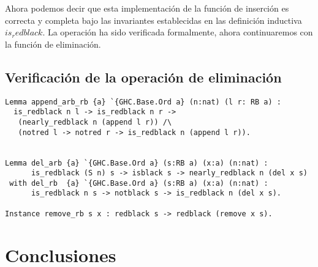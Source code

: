 \documentclass[letterpaper,12pt,oneside]{book}
\theoremstyle{plain}
\theoremstyle{definition}
\theoremstyle{remark}
\begin{document}
Ahora podemos decir que esta implementaci\'on de la funci\'on de inserci\'on es correcta y completa bajo las invariantes establecidas en las definici\'on inductiva $is_redblack$. La operaci\'on ha sido verificada formalmente, ahora continuaremos con la funci\'on de eliminaci\'on.  
\section{Verificación de la operación de eliminación}
\begin{verbatim}
Lemma append_arb_rb {a} `{GHC.Base.Ord a} (n:nat) (l r: RB a) : 
  is_redblack n l -> is_redblack n r ->
   (nearly_redblack n (append l r)) /\
   (notred l -> notred r -> is_redblack n (append l r)).


Lemma del_arb {a} `{GHC.Base.Ord a} (s:RB a) (x:a) (n:nat) :
      is_redblack (S n) s -> isblack s -> nearly_redblack n (del x s)
 with del_rb  {a} `{GHC.Base.Ord a} (s:RB a) (x:a) (n:nat) :
      is_redblack n s -> notblack s -> is_redblack n (del x s).

Instance remove_rb s x : redblack s -> redblack (remove x s).
\end{verbatim}
\chapter{Conclusiones}  
\backmatter%
\end{document}

